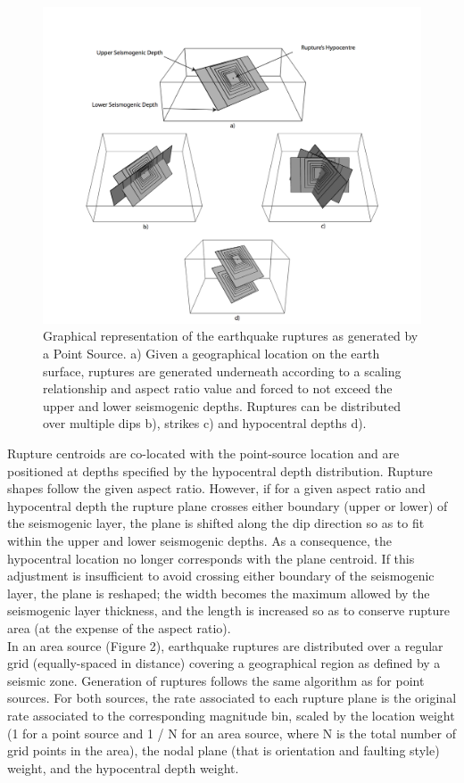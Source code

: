 \begin{figure}
\centering
\includegraphics[width=14cm]{./Pictures/PointSource.jpg}
\caption{Graphical representation of the earthquake ruptures as generated by a Point Source. a) Given a geographical location on the earth surface, ruptures are generated underneath according to a scaling relationship and aspect ratio value and forced to not exceed the upper and lower seismogenic depths. Ruptures can be distributed over multiple dips b), strikes c) and hypocentral depths d).}
\label{fig:PointSource}
\end{figure}
Rupture centroids are co-located with the point-source location and are positioned at depths specified by the hypocentral depth distribution. Rupture shapes follow the given aspect ratio. However, if for a given aspect ratio and hypocentral depth the rupture plane crosses either boundary (upper or lower) of the seismogenic layer, the plane is shifted along the dip direction so as to fit within the upper and lower seismogenic depths. As a consequence, the hypocentral location no longer corresponds with the plane centroid. If this adjustment is insufficient to avoid crossing either boundary of the seismogenic layer, the plane is reshaped; the width becomes the maximum allowed by the seismogenic layer thickness, and the length is increased so as to conserve rupture area (at the expense of the aspect ratio).\\
In an area source (Figure 2), earthquake ruptures are distributed over a regular grid (equally-spaced in distance) covering a geographical region as defined by a seismic zone. Generation of ruptures follows the same algorithm as for point sources. For both sources, the rate associated to each rupture plane is the original rate associated to the corresponding magnitude bin, scaled by the location weight (1 for a point source and 1 / N for an area source, where N is the total number of grid points in the area), the nodal plane (that is orientation and faulting style) weight, and the hypocentral depth weight.\\
